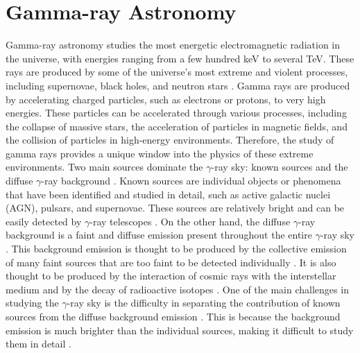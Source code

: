 \section{Gamma-ray Astronomy}
\label{s:Gamma-Ray-Astronomy}
Gamma-ray astronomy studies the most energetic electromagnetic radiation in the universe, with energies ranging from a few hundred keV to several TeV. These rays are produced by some of the universe's most extreme and violent processes, including supernovae, black holes, and neutron stars \cite{Fishman1995}. Gamma rays are produced by accelerating charged particles, such as electrons or protons, to very high energies. These particles can be accelerated through various processes, including the collapse of massive stars, the acceleration of particles in magnetic fields, and the collision of particles in high-energy environments. Therefore, the study of gamma rays provides a unique window into the physics of these extreme environments.
Two main sources dominate the $\gamma$-ray sky: known sources and the diffuse $\gamma$-ray background \cite{Ackermann2015}. Known sources are individual objects or phenomena that have been identified and studied in detail, such as active galactic nuclei (AGN), pulsars, and supernovae. These sources are relatively bright and can be easily detected by $\gamma$-ray telescopes \cite{Abdo2010}.
On the other hand, the diffuse $\gamma$-ray background is a faint and diffuse emission present throughout the entire $\gamma$-ray sky \cite{Ackermann2015}. This background emission is thought to be produced by the collective emission of many faint sources that are too faint to be detected individually \cite{Abdo2010}. It is also thought to be produced by the interaction of cosmic rays with the interstellar medium and by the decay of radioactive isotopes \cite{bulgarelli_2019}.
One of the main challenges in studying the $\gamma$-ray sky is the difficulty in separating the contribution of known sources from the diffuse background emission \cite{Ackermann2015}. This is because the background emission is much brighter than the individual sources, making it difficult to study them in detail \cite{Abdo2010}. 
